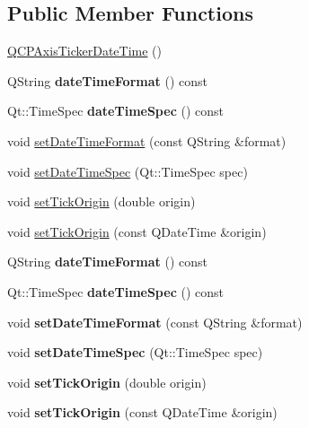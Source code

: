 \subsection*{Public Member Functions}
\begin{DoxyCompactItemize}
\item 
\hyperlink{class_q_c_p_axis_ticker_date_time_a84cc5c6bbc7c99c1f9bd4b3a392e1b9d}{Q\+C\+P\+Axis\+Ticker\+Date\+Time} ()
\item 
\mbox{\label{class_q_c_p_axis_ticker_date_time_aac8e2bb32ca8ff1394c42d2d62390718}} 
Q\+String {\bfseries date\+Time\+Format} () const
\item 
\mbox{\label{class_q_c_p_axis_ticker_date_time_ae688e69ba55c9247af26b6db85cf9573}} 
Qt\+::\+Time\+Spec {\bfseries date\+Time\+Spec} () const
\item 
void \hyperlink{class_q_c_p_axis_ticker_date_time_ad52660a82f688395468674d555f6a86b}{set\+Date\+Time\+Format} (const Q\+String \&format)
\item 
void \hyperlink{class_q_c_p_axis_ticker_date_time_afbd987c7197e42ab61e67fb1c38abebc}{set\+Date\+Time\+Spec} (Qt\+::\+Time\+Spec spec)
\item 
void \hyperlink{class_q_c_p_axis_ticker_date_time_a5388e048cbd32cf1ba730b9f1859eb5c}{set\+Tick\+Origin} (double origin)
\item 
void \hyperlink{class_q_c_p_axis_ticker_date_time_a2ea905872b8171847a49a5e093fb0c48}{set\+Tick\+Origin} (const Q\+Date\+Time \&origin)
\item 
\mbox{\label{class_q_c_p_axis_ticker_date_time_aac8e2bb32ca8ff1394c42d2d62390718}} 
Q\+String {\bfseries date\+Time\+Format} () const
\item 
\mbox{\label{class_q_c_p_axis_ticker_date_time_ae688e69ba55c9247af26b6db85cf9573}} 
Qt\+::\+Time\+Spec {\bfseries date\+Time\+Spec} () const
\item 
\mbox{\label{class_q_c_p_axis_ticker_date_time_ad52660a82f688395468674d555f6a86b}} 
void {\bfseries set\+Date\+Time\+Format} (const Q\+String \&format)
\item 
\mbox{\label{class_q_c_p_axis_ticker_date_time_afbd987c7197e42ab61e67fb1c38abebc}} 
void {\bfseries set\+Date\+Time\+Spec} (Qt\+::\+Time\+Spec spec)
\item 
\mbox{\label{class_q_c_p_axis_ticker_date_time_a5388e048cbd32cf1ba730b9f1859eb5c}} 
void {\bfseries set\+Tick\+Origin} (double origin)
\item 
\mbox{\label{class_q_c_p_axis_ticker_date_time_a2ea905872b8171847a49a5e093fb0c48}} 
void {\bfseries set\+Tick\+Origin} (const Q\+Date\+Time \&origin)
\end{DoxyCompactItemize}
